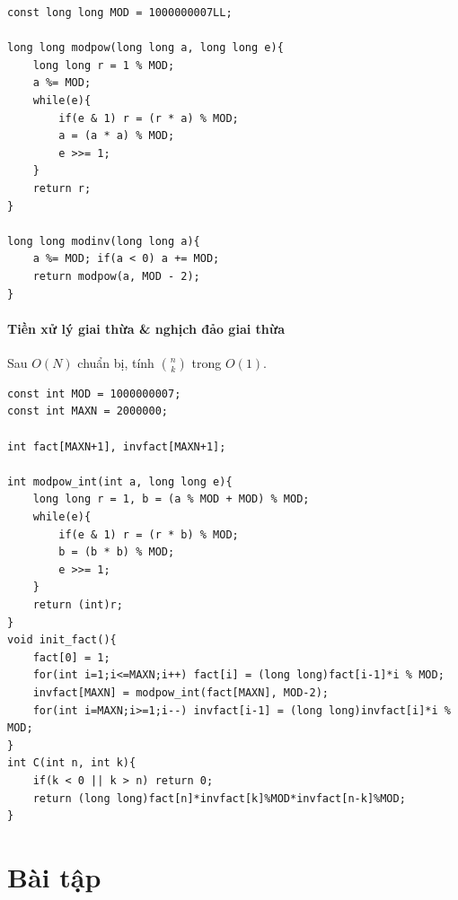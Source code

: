 \begin{lstlisting}[caption={Lũy thừa nhanh và nghịch đảo modulo (C++)}]
const long long MOD = 1000000007LL;

long long modpow(long long a, long long e){
    long long r = 1 % MOD;
    a %= MOD;
    while(e){
        if(e & 1) r = (r * a) % MOD;
        a = (a * a) % MOD;
        e >>= 1;
    }
    return r;
}

long long modinv(long long a){
    a %= MOD; if(a < 0) a += MOD;
    return modpow(a, MOD - 2);
}
\end{lstlisting}

\paragraph{Tiền xử lý giai thừa \& nghịch đảo giai thừa}
Sau $O(N)$ chuẩn bị, tính $\binom{n}{k}$ trong $O(1)$.

\begin{lstlisting}[caption={Precompute factorial / invfactorial; tính C(n,k)}]
const int MOD = 1000000007;
const int MAXN = 2000000; 

int fact[MAXN+1], invfact[MAXN+1];

int modpow_int(int a, long long e){
    long long r = 1, b = (a % MOD + MOD) % MOD;
    while(e){
        if(e & 1) r = (r * b) % MOD;
        b = (b * b) % MOD;
        e >>= 1;
    }
    return (int)r;
}
void init_fact(){
    fact[0] = 1;
    for(int i=1;i<=MAXN;i++) fact[i] = (long long)fact[i-1]*i % MOD;
    invfact[MAXN] = modpow_int(fact[MAXN], MOD-2);
    for(int i=MAXN;i>=1;i--) invfact[i-1] = (long long)invfact[i]*i % MOD;
}
int C(int n, int k){
    if(k < 0 || k > n) return 0;
    return (long long)fact[n]*invfact[k]%MOD*invfact[n-k]%MOD;
}
\end{lstlisting}

\section{Bài tập}

